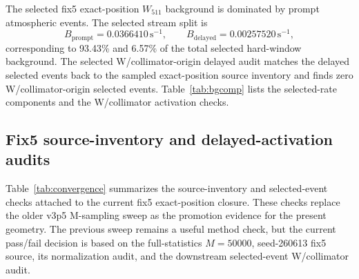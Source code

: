 \documentclass[preprint,12pt]{elsarticle}
\newcommand{\cps}{\,\mathrm{s^{-1}}}
\newcommand{\wii}{W_{511}}
\begin{document}
The selected fix5 exact-position $\wii$ background is dominated by prompt atmospheric events. The selected stream split is
\begin{equation}
  B_{\mathrm{prompt}}=0.0366410\cps,\qquad
  B_{\mathrm{delayed}}=0.00257520\cps ,
\end{equation}
corresponding to 93.43\% and 6.57\% of the total selected hard-window background. The selected W/collimator-origin delayed audit matches the delayed selected events back to the sampled exact-position source inventory and finds zero W/collimator-origin selected events. Table~\ref{tab:bgcomp} lists the selected-rate components and the W/collimator activation checks.

\begin{table}[t]
\centering
\caption{Selected $\wii$ background composition in the current fix5 exact-position chain. Percentages are relative to the total $\wii$ background unless otherwise stated.}
\label{tab:bgcomp}
\footnotesize
{}
\end{table}

\subsection{Fix5 source-inventory and delayed-activation audits}
\label{subsec:convergence}

Table~\ref{tab:convergence} summarizes the source-inventory and selected-event checks attached to the current fix5 exact-position closure. These checks replace the older v3p5 M-sampling sweep as the promotion evidence for the present geometry. The previous sweep remains a useful method check, but the current pass/fail decision is based on the full-statistics $M=50000$, seed-260613 fix5 source, its normalization audit, and the downstream selected-event W/collimator audit.
\end{document}
